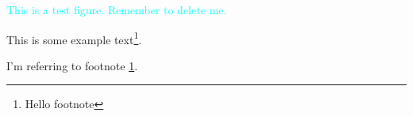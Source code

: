 \documentclass[12pt]{article}
\begin{document}
\textcolor{cyan}{This is a test figure. Remember to delete me.}



This is some example text\footnote{\label{myfootnote}Hello footnote}.

I'm referring to footnote \ref{myfootnote}.


\newpage
\begin{appendix}
    \listoffigures
    \listoftables
    \listoflistings
    \printbibliography
\end{appendix}
\end{document}
